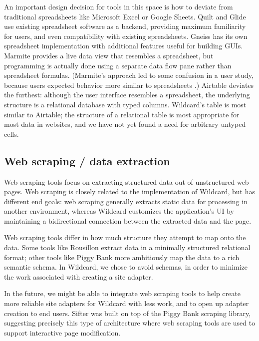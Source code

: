\documentclass[english,submission]{programming}
\begin{document}
An important design decision for tools in this space is how to deviate
from traditional spreadsheets like Microsoft Excel or Google Sheets.
Quilt and Glide use existing spreadsheet software as a backend,
providing maximum familiarity for users, and even compatibility with
existing spreadsheets. Gneiss has its own spreadsheet implementation
with additional features useful for building GUIs. Marmite provides a
live data view that resembles a spreadsheet, but programming is actually
done using a separate data flow pane rather than spreadsheet formulas.
(Marmite's approach led to some confusion in a user study, because users
expected behavior more similar to spreadsheets \autocite{wong2007}.)
Airtable deviates the furthest: although the user interface resembles a
spreadsheet, the underlying structure is a relational database with
typed columns. Wildcard's table is most similar to Airtable; the
structure of a relational table is most appropriate for most data in
websites, and we have not yet found a need for arbitrary untyped cells.

\hypertarget{web-scraping-data-extraction}{%
\subsection{Web scraping / data
extraction}\label{web-scraping-data-extraction}}

Web scraping tools focus on extracting structured data out of
unstructured web pages. Web scraping is closely related to the
implementation of Wildcard, but has different end goals: web scraping
generally extracts static data for processing in another environment,
whereas Wildcard customizes the application's UI by maintaining a
bidirectional connection between the extracted data and the page.

Web scraping tools differ in how much structure they attempt to map onto
the data. Some tools like Rousillon \autocite{chasins2018} extract data
in a minimally structured relational format; other tools like Piggy Bank
\autocite{huynh2005} more ambitiously map the data to a rich semantic
schema. In Wildcard, we chose to avoid schemas, in order to minimize the
work associated with creating a site adapter.

In the future, we might be able to integrate web scraping tools to help
create more reliable site adapters for Wildcard with less work, and to
open up adapter creation to end users. Sifter was built on top of the
Piggy Bank scraping library, suggesting precisely this type of
architecture where web scraping tools are used to support interactive
page modification.
\end{document}
